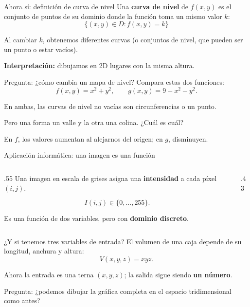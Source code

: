 \documentclass[main.tex]{subfiles}
\begin{document}
\begin{frame}{Ahora sí: definición de curva de nivel}
Una \textbf{curva de nivel} de $f(x,y)$ es el conjunto de puntos de su dominio donde la función toma un mismo valor $k$:
\[
\boxed{\{(x,y)\in D:f(x,y)=k\}}
\]
\medskip

Al cambiar $k$, obtenemos diferentes curvas (o conjuntos de nivel, que pueden ser un punto o estar vacíos).
\medskip

\textbf{Interpretación:} dibujamos en 2D lugares con la misma altura.
\end{frame}

\begin{frame}{Pregunta: ¿cómo cambia un mapa de nivel?}
Compara estas dos funciones:
\[
f(x,y)=x^2+y^2,
\qquad
g(x,y)=9-x^2-y^2.
\]
\medskip

En ambas, las curvas de nivel no vacías son circunferencias o un punto.
\medskip

\alert{Pero una forma un valle y la otra una colina. ¿Cuál es cuál?}
\pause
\medskip

En $f$, los valores aumentan al alejarnos del origen; en $g$, disminuyen.
\end{frame}

\begin{frame}{Aplicación informática: una imagen es una función}
\begin{columns}[c]
\begin{column}{.55\textwidth}
Una imagen en escala de grises asigna una \textbf{intensidad} a cada píxel $(i,j)$.
\medskip

\[
I(i,j)\in\{0,\ldots,255\}.
\]
\medskip

Es una función de dos variables, pero con \textbf{dominio discreto}.
\end{column}
\begin{column}{.43\textwidth}
\end{column}
\end{columns}
\end{frame}

\begin{frame}{¿Y si tenemos tres variables de entrada?}
El volumen de una caja depende de su longitud, anchura y altura:
\[
V(x,y,z)=xyz.
\]
\medskip

Ahora la entrada es una terna $(x,y,z)$; la salida sigue siendo \textbf{un número}.
\medskip

\alert{Pregunta:} ¿podemos dibujar la gráfica completa en el espacio tridimensional como antes?
\end{frame}
\end{document}
